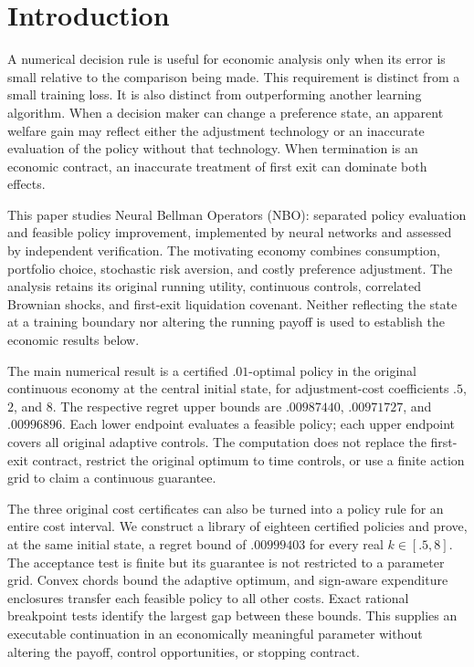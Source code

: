 \section{Introduction}
A numerical decision rule is useful for economic analysis only when its error is small relative to the comparison being made. This requirement is distinct from a small training loss. It is also distinct from outperforming another learning algorithm. When a decision maker can change a preference state, an apparent welfare gain may reflect either the adjustment technology or an inaccurate evaluation of the policy without that technology. When termination is an economic contract, an inaccurate treatment of first exit can dominate both effects.

This paper studies Neural Bellman Operators (NBO): separated policy evaluation and feasible policy improvement, implemented by neural networks and assessed by independent verification. The motivating economy combines consumption, portfolio choice, stochastic risk aversion, and costly preference adjustment. The analysis retains its original running utility, continuous controls, correlated Brownian shocks, and first-exit liquidation covenant. Neither reflecting the state at a training boundary nor altering the running payoff is used to establish the economic results below.

The main numerical result is a certified $.01$-optimal policy in the original continuous economy at the central initial state, for adjustment-cost coefficients $.5$, $2$, and $8$. The respective regret upper bounds are $.00987440$, $.00971727$, and $.00996896$. Each lower endpoint evaluates a feasible policy; each upper endpoint covers all original adaptive controls. The computation does not replace the first-exit contract, restrict the original optimum to time controls, or use a finite action grid to claim a continuous guarantee.

The three original cost certificates can also be turned into a policy rule for an entire cost interval. We construct a library of eighteen certified policies and prove, at the same initial state, a regret bound of $.00999403$ for every real $k\in[.5,8]$. The acceptance test is finite but its guarantee is not restricted to a parameter grid. Convex chords bound the adaptive optimum, and sign-aware expenditure enclosures transfer each feasible policy to all other costs. Exact rational breakpoint tests identify the largest gap between these bounds. This supplies an executable continuation in an economically meaningful parameter without altering the payoff, control opportunities, or stopping contract.

